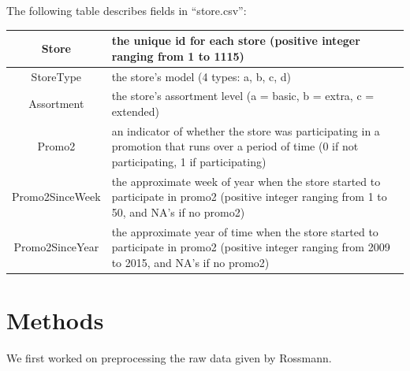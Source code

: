\documentclass[letterpaper,twocolumn,11pt]{article}
\begin{document}
\hfill \break

The following table describes fields in ``store.csv'':

\begin{tabular}{| c | L{3.5cm} |}
  \hline
  Store & the unique id for each store (positive integer ranging from 1 to 1115) \\ \hline
  StoreType & the store's model (4 types: a, b, c, d) \\ \hline
  Assortment & the store's assortment level (a = basic, b = extra, c = extended) \\ \hline
  Promo2 & an indicator of whether the store was participating in a promotion that runs over a period of time  (0 if not participating, 1 if participating) \\ \hline
  Promo2SinceWeek & the approximate week of year when the store started to participate in promo2 (positive integer ranging from 1 to 50, and NA's if no promo2) \\ \hline
  Promo2SinceYear & the approximate year of time when the store started to participate in promo2 (positive integer ranging from 2009 to 2015, and NA's if no promo2) \\ \hline
\end{tabular}

\section{Methods}
We first worked on preprocessing the raw data given by Rossmann.
\end{document}
